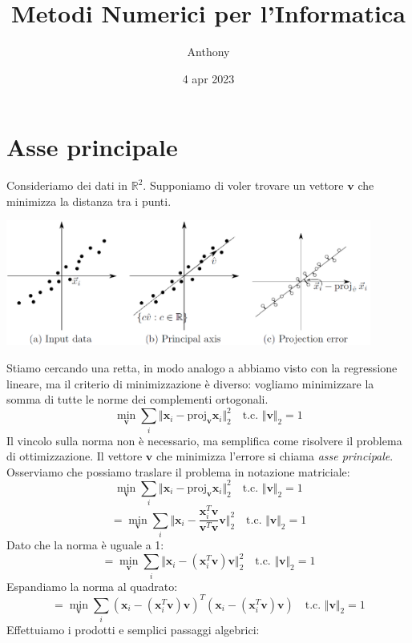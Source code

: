 \documentclass{article}
\title{Metodi Numerici per l'Informatica}
\author{Anthony}
\date{4 apr 2023}
\begin{document}
    \maketitle

    \section{Asse principale}
        Consideriamo dei dati in $\mathbb{R}^2$. Supponiamo di voler trovare un vettore $\mathbf{v}$ che minimizza la 
        distanza tra i punti.
        \begin{center}\includegraphics[width=12cm]{principal_axis.png}\end{center}
        Stiamo cercando una retta, in modo analogo a abbiamo visto con la regressione lineare, ma il criterio di 
        minimizzazione è diverso: vogliamo minimizzare la somma di tutte le norme dei complementi ortogonali.
        \[ \min_\mathbf{v} \sum_i \Vert \mathbf{x}_i - \text{proj}_\mathbf{v}\mathbf{x}_i \Vert_2^2 \quad \text{t.c. }\Vert\mathbf{v}\Vert_2 = 1\]
        Il vincolo sulla norma non è necessario, ma semplifica come risolvere il problema di ottimizzazione. Il vettore 
        $\mathbf{v}$ che minimizza l'errore si chiama \emph{asse principale}. 
        Osserviamo che possiamo traslare il problema in notazione matriciale:
        \[ \min_\mathbf{v} \sum_i \Vert \mathbf{x}_i - \text{proj}_\mathbf{v}\mathbf{x}_i \Vert_2^2 \quad \text{t.c. }\Vert\mathbf{v}\Vert_2 = 1\]
        \[ = \min_\mathbf{v} \sum_i \Vert \mathbf{x}_i - \frac{\mathbf{x}_i^T\mathbf{v}}{\mathbf{v}^T\mathbf{v}}\mathbf{v} \Vert_2^2 \quad \text{t.c. }\Vert\mathbf{v}\Vert_2 = 1\]
        Dato che la norma è uguale a 1:
        \[ = \min_\mathbf{v} \sum_i \Vert \mathbf{x}_i - (\mathbf{x}_i^T\mathbf{v}) \mathbf{v} \Vert_2^2 \quad \text{t.c. }\Vert\mathbf{v}\Vert_2 = 1 \]
        Espandiamo la norma al quadrato:
        \[ = \min_\mathbf{v} \sum_i (\mathbf{x}_i - (\mathbf{x}_i^T\mathbf{v}) \mathbf{v})^T(\mathbf{x}_i - (\mathbf{x}_i^T\mathbf{v}) \mathbf{v})  \quad \text{t.c. } \Vert \mathbf{v} \Vert_2 = 1 \]
        Effettuiamo i prodotti e semplici passaggi algebrici:
\end{document}
